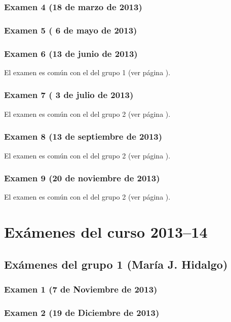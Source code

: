 \documentclass[a4paper,12pt,twoside]{book}
\begin{document}
\subsection{Examen 4 (18 de marzo de 2013)}
\subsection{Examen 5 ( 6 de mayo de 2013)} 
\subsection{Examen 6 (13 de junio de 2013)} 
El examen es común con el del grupo 1 (ver página \pageref{examen_12_13_1_6}). 
\subsection{Examen 7 ( 3 de julio de 2013)} 
El examen es común con el del grupo 2 (ver página \pageref{examen_12_13_2_7}). 
\subsection{Examen 8 (13 de septiembre de 2013)} 
El examen es común con el del grupo 2 (ver página \pageref{examen_12_13_2_8}).
\subsection{Examen 9 (20 de noviembre de 2013)} 
El examen es común con el del grupo 2 (ver página \pageref{examen_12_13_2_9}).

\chapter{Exámenes del curso 2013--14}

\section{Exámenes del grupo 1 (María J. Hidalgo)}
\subsection{Examen 1 (7 de Noviembre de 2013)}
\subsection{Examen 2 (19 de Diciembre de 2013)}
\end{document}

